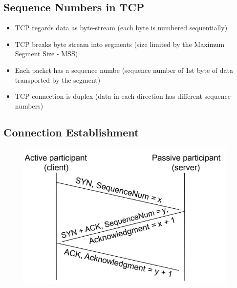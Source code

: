 \documentclass[../resumosRCOM.tex]{subfiles}
\begin{document}
\subsection{Sequence Numbers in TCP}
\begin{itemize}
    \item TCP regards data as byte-stream (each byte is numbered sequentially)
    \item TCP breaks byte stream into segments (size limited by the Maximum Segment Size - MSS)
    \item Each packet has a sequence numbe (sequence number of 1st byte of data transported by the segment)
    \item TCP connection is duplex (data in each direction has different sequence numbers)
\end{itemize}

\subsection{Connection Establishment}
\begin{figure}[h]
    \centering
    \includegraphics[width=11cm]{images/trans7.JPG}
\end{figure}
\end{document}
